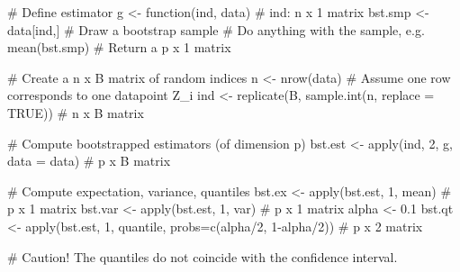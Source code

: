 \begin{code}
 # Define estimator
 g <- function(ind, data){ # ind: n x 1 matrix
    bst.smp <- data[ind,] # Draw a bootstrap sample
    # Do anything with the sample, e.g. mean(bst.smp)
    # Return a p x 1 matrix
 }
 
 # Create a n x B matrix of random indices
 n <- nrow(data) # Assume one row corresponds to one datapoint Z_i
 ind <- replicate(B, sample.int(n, replace = TRUE)) # n x B matrix
 
 # Compute bootstrapped estimators (of dimension p)
 bst.est <- apply(ind, 2, g, data = data) # p x B matrix
 
 # Compute expectation, variance, quantiles
 bst.ex  <- apply(bst.est, 1, mean) # p x 1 matrix
 bst.var <- apply(bst.est, 1, var)  # p x 1 matrix
 alpha <- 0.1
 bst.qt  <- apply(bst.est, 1, quantile, probs=c(alpha/2, 1-alpha/2)) # p x 2 matrix

 # Caution! The quantiles do not coincide with the confidence interval.
 \end{code}

 